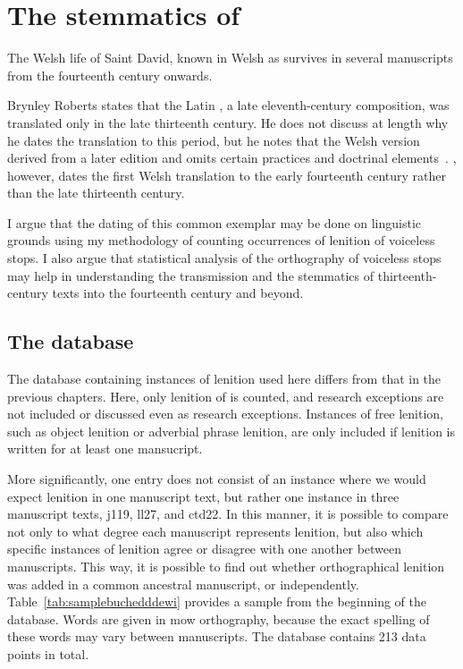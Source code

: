 \chapter{The stemmatics of }
\label{cha:stemm-mwbuch-dewi}
The Welsh life of Saint David, known in Welsh as  survives in several manuscripts from the fourteenth century onwards. 

Brynley Roberts states that the Latin , a late eleventh-century composition, was translated only in the late thirteenth century. He does not discuss at length why he dates the translation to this period, but he notes that the Welsh version derived from a later edition and omits certain practices and doctrinal elements~\autocite[218--219]{Rob_Ystoriaeu11}. \Textcite[lviii]{Eva_Welsh88}, however, dates the first Welsh translation to the early fourteenth century rather than the late thirteenth century.

I argue that the dating of this common exemplar may be done on linguistic grounds using my methodology of counting occurrences of lenition of voiceless stops. I also argue that statistical analysis of the orthography of voiceless stops may help in understanding the transmission and the stemmatics of thirteenth-century texts into the fourteenth century and beyond.



\section{The database}
\label{sec:database}

The database containing instances of lenition used here differs from that in the previous chapters. Here, only lenition of  is counted, and research exceptions are not included or discussed even as research exceptions. Instances of free lenition, such as object lenition or adverbial phrase lenition, are only included if lenition is written for at least one mansucript.


More significantly, one entry does not consist of an instance where we would expect lenition in one manuscript text, but rather one instance in three manuscript texts, \gls{j119}, \gls{ll27}, and \gls{ctd22}. In this manner, it is possible to compare not only to what degree each manuscript represents lenition, but also which specific instances of lenition agree or disagree with one another between manuscripts. This way, it is possible to find out whether orthographical lenition was added in a common ancestral manuscript, or independently. Table~\ref{tab:samplebuchedddewi} provides a sample from the beginning of the database. Words are given in \gls{mow} orthography, because the exact spelling of these words may vary between manuscripts. The database contains 213 data points in total.

